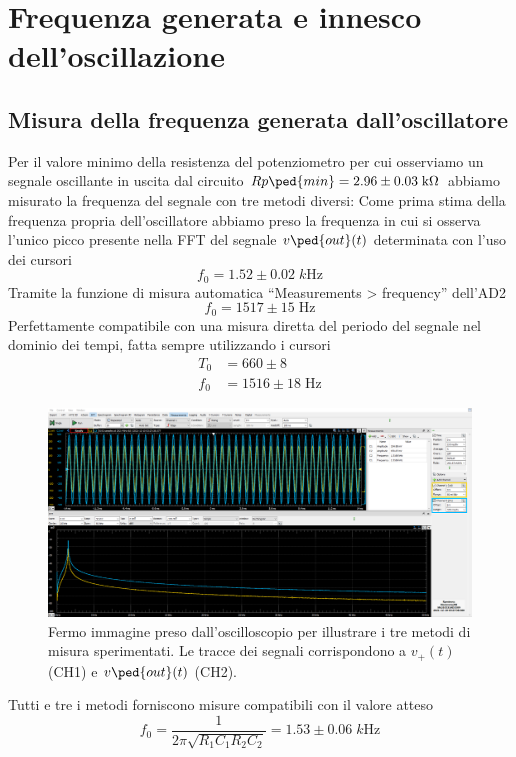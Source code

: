 \documentclass[10pt, a4paper, italian]{article}
\begin{document}
\section{Frequenza generata e innesco dell'oscillazione}
\subsection{Misura della frequenza generata dall'oscillatore}
Per il valore minimo della resistenza del potenziometro per cui osserviamo
un segnale oscillante in uscita dal circuito %
$Rp\ped{min} = 2.96 \pm 0.03 \; \si{k\ohm}$ abbiamo misurato la frequenza del
segnale con tre metodi diversi:
Come prima stima della frequenza propria dell'oscillatore abbiamo preso la
frequenza in cui si osserva l'unico picco presente nella FFT del segnale
$v\ped{out} (t)$ determinata con l'uso dei cursori
\[
f_0 = 1.52 \pm 0.02 \; \si{k\Hz}
\]
Tramite la funzione di misura automatica ``Measurements > frequency''
dell'AD2
\[
f_0 = 1517 \pm 15 \; \si{\Hz}
\]
Perfettamente compatibile con una misura diretta del periodo del segnale nel
dominio dei tempi, fatta sempre utilizzando i cursori
\begin{align*}
T_0 &= 660 \pm 8 \\
f_0 &= 1516 \pm 18 \; \si{\Hz}
\end{align*}

\begin{figure}[htbp]
	\centering
	\includegraphics[scale=0.335]{Rpminosc}
	\caption{Fermo immagine preso dall'oscilloscopio per illustrare i tre
	metodi di misura sperimentati. Le tracce dei segnali corrispondono a
	$v_+ (t)$ (CH1) e $v\ped{out} (t)$ (CH2). \label{fig: Rpdist}}
\end{figure}

Tutti e tre i metodi forniscono misure compatibili con il valore atteso
\begin{equation}
f_0 =\frac{1}{2 \pi \sqrt{R_1 C_1 R_2 C_2}} = 1.53 \pm 0.06 \; \si{k\Hz}
\end{equation}
\end{document}
